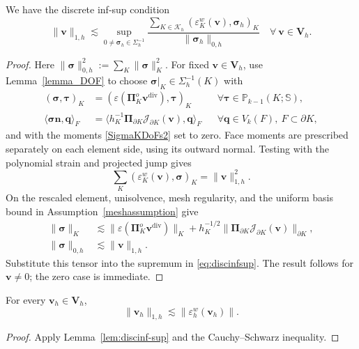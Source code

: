 \documentclass[review,hidelinks,onefignum,onetabnum]{siamart251216}
\newcommand{\AI}[1]{{\color{blue}#1}}
\begin{document}
\begin{lemma} \label{lem:discinf-sup}
We have the discrete inf-sup condition
\begin{equation}\label{eq:discinfsup}
\|\boldsymbol{v}\|_{1,h}\lesssim \sup_{0\ne\boldsymbol{\sigma}_h\in\Sigma_h^{-1}}
\frac{\sum_{K\in\mathcal{K}_h}(\varepsilon_K^w(\boldsymbol{v}), \boldsymbol{\sigma}_h)_K}{\|\boldsymbol{\sigma}_h\|_{0,h}}\quad\forall~\boldsymbol{v}\in\boldsymbol V_h.
\end{equation}
\end{lemma}
\AI{\begin{proof}
Here $\|\boldsymbol\sigma\|_{0,h}^2:=\sum_K\|\boldsymbol\sigma\|_K^2$.
For fixed $\boldsymbol v\in\boldsymbol V_h$, use Lemma~\ref{lemma_DOF}
to choose $\boldsymbol\sigma|_K\in\Sigma_h^{-1}(K)$ with
\[
\begin{aligned}
(\boldsymbol\sigma,\boldsymbol\tau)_K
&=(\varepsilon(\boldsymbol\Pi_K^o\boldsymbol v^{\operatorname{div}}),\boldsymbol\tau)_K
&&\forall\boldsymbol\tau\in\mathbb P_{k-1}(K;\mathbb S),\\
\langle\boldsymbol\sigma\boldsymbol n,\boldsymbol q\rangle_F
&=\langle h_K^{-1}\boldsymbol\Pi_{\partial K}\mathcal J_{\partial K}(\boldsymbol v),\boldsymbol q\rangle_F
&&\forall\boldsymbol q\in V_k(F),\ F\subset\partial K,
\end{aligned}
\]
and with the moments \eqref{SigmaKDoFs2} set to zero.
Face moments are prescribed separately on each element side, using its
outward normal. Testing with the polynomial strain and projected jump gives
\[
\sum_K(\varepsilon_K^w(\boldsymbol v),\boldsymbol\sigma)_K
=\|\boldsymbol v\|_{1,h}^2.
\]
On the rescaled element, unisolvence, mesh regularity, and the uniform
basis bound in Assumption~\ref{meshassumption} give
\[
\begin{aligned}
\|\boldsymbol\sigma\|_K
&\lesssim\|\varepsilon(\boldsymbol\Pi_K^o\boldsymbol v^{\operatorname{div}})\|_K
+h_K^{-1/2}\|\boldsymbol\Pi_{\partial K}\mathcal J_{\partial K}(\boldsymbol v)\|_{\partial K},\\
\|\boldsymbol\sigma\|_{0,h}&\lesssim\|\boldsymbol v\|_{1,h}.
\end{aligned}
\]
Substitute this tensor into the supremum in \eqref{eq:discinfsup}.
The result follows for $\boldsymbol v\ne0$; the zero case is immediate.
\end{proof}}



\begin{lemma}\label{lem:coercive-strain}
For every $\boldsymbol v_h\in\boldsymbol V_h$,
\[
\|\boldsymbol v_h\|_{1,h}\lesssim\|\varepsilon_h^w(\boldsymbol v_h)\|.
\]
\end{lemma}
\begin{proof}
Apply Lemma~\ref{lem:discinf-sup} and the Cauchy--Schwarz inequality.
\end{proof}
\end{document}
